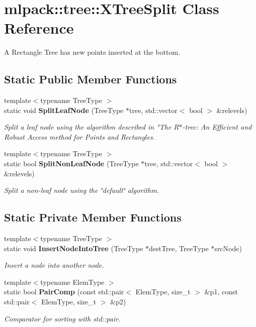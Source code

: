 \section{mlpack\+:\+:tree\+:\+:X\+Tree\+Split Class Reference}
\label{classmlpack_1_1tree_1_1XTreeSplit}


A Rectangle Tree has new points inserted at the bottom.  


\subsection*{Static Public Member Functions}
\begin{DoxyCompactItemize}
\item 
{\footnotesize template$<$typename Tree\+Type $>$ }\\static void {\bf Split\+Leaf\+Node} (Tree\+Type $\ast$tree, std\+::vector$<$ bool $>$ \&relevels)
\begin{DoxyCompactList}\small\item\em Split a leaf node using the algorithm described in "The R$\ast$-\/tree\+: An Efficient and Robust Access method for Points and Rectangles. \end{DoxyCompactList}\item 
{\footnotesize template$<$typename Tree\+Type $>$ }\\static bool {\bf Split\+Non\+Leaf\+Node} (Tree\+Type $\ast$tree, std\+::vector$<$ bool $>$ \&relevels)
\begin{DoxyCompactList}\small\item\em Split a non-\/leaf node using the \char`\"{}default\char`\"{} algorithm. \end{DoxyCompactList}\end{DoxyCompactItemize}
\subsection*{Static Private Member Functions}
\begin{DoxyCompactItemize}
\item 
{\footnotesize template$<$typename Tree\+Type $>$ }\\static void {\bf Insert\+Node\+Into\+Tree} (Tree\+Type $\ast$dest\+Tree, Tree\+Type $\ast$src\+Node)
\begin{DoxyCompactList}\small\item\em Insert a node into another node. \end{DoxyCompactList}\item 
{\footnotesize template$<$typename Elem\+Type $>$ }\\static bool {\bf Pair\+Comp} (const std\+::pair$<$ Elem\+Type, size\+\_\+t $>$ \&p1, const std\+::pair$<$ Elem\+Type, size\+\_\+t $>$ \&p2)
\begin{DoxyCompactList}\small\item\em Comparator for sorting with std\+::pair. \end{DoxyCompactList}\end{DoxyCompactItemize}


